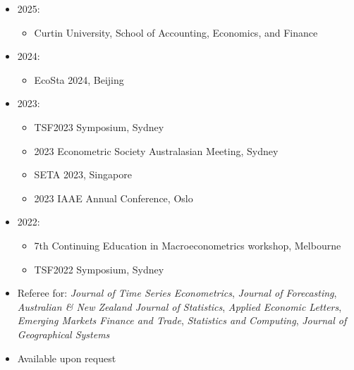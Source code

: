\documentclass[letterpaper,10pt]{article}
\begin{document}
\begin{itemize}
  \item 2025:
    \begin{itemize}
      \item Curtin University, School of Accounting, Economics, and Finance 
    \end{itemize}
  \item 2024:
    \begin{itemize}
      \item EcoSta 2024, Beijing
    \end{itemize}
  \item 2023:
    \begin{itemize}
      \item TSF2023 Symposium, Sydney
      \item 2023 Econometric Society Australasian Meeting, Sydney
      \item SETA 2023, Singapore
      \item 2023 IAAE Annual Conference, Oslo
    \end{itemize}
  \item 2022:
    \begin{itemize}
      \item 7th Continuing Education in Macroeconometrics workshop, Melbourne
      \item TSF2022 Symposium, Sydney
    \end{itemize}
\end{itemize}


\begin{itemize}
  \item Referee for: \textit{Journal of Time Series Econometrics}, \textit{Journal of Forecasting}, \textit{Australian \& New Zealand Journal of Statistics}, \textit{Applied Economic Letters}, \textit{Emerging Markets Finance and Trade}, \textit{Statistics and Computing}, \textit{Journal of Geographical Systems}
\end{itemize}


\begin{itemize}
  \item Available upon request
\end{itemize}
\end{document}
